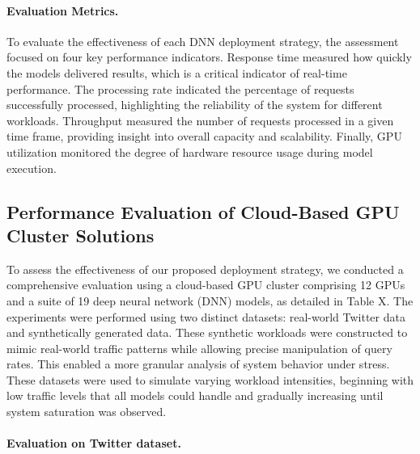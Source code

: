 \paragraph{Evaluation Metrics.} To evaluate the effectiveness of each DNN deployment strategy, the assessment focused on four key performance indicators. Response time measured how quickly the models delivered results, which is a critical indicator of real-time performance. The processing rate indicated the percentage of requests successfully processed, highlighting the reliability of the system for different workloads. Throughput measured the number of requests processed in a given time frame, providing insight into overall capacity and scalability. Finally, GPU utilization monitored the degree of hardware resource usage during model execution.


\subsection{Performance Evaluation of Cloud-Based GPU Cluster Solutions}

To assess the effectiveness of our proposed deployment strategy, we conducted a comprehensive evaluation using a cloud-based GPU cluster comprising 12 GPUs and a suite of 19 deep neural network (DNN) models, as detailed in Table X. The experiments were performed using two distinct datasets: real-world Twitter data and synthetically generated data.  These synthetic workloads were constructed to mimic real-world traffic patterns while allowing precise manipulation of query rates. This enabled a more granular analysis of system behavior under stress. These datasets were used to simulate varying workload intensities, beginning with low traffic levels that all models could handle and gradually increasing until system saturation was observed.

\paragraph{Evaluation on Twitter dataset.}

